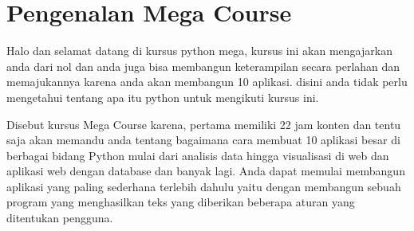 \section{Pengenalan Mega Course}

Halo dan selamat datang di kursus python mega, kursus ini akan mengajarkan anda dari nol dan anda juga bisa membangun keterampilan secara perlahan dan memajukannya karena anda akan membangun 10 aplikasi. disini anda tidak perlu mengetahui tentang apa itu python untuk mengikuti kursus ini.

Disebut kursus Mega Course karena, pertama memiliki 22 jam konten dan tentu saja akan memandu anda tentang bagaimana cara membuat 10 aplikasi besar di berbagai bidang Python mulai dari analisis data hingga visualisasi di web dan aplikasi web dengan database dan banyak lagi. Anda dapat memulai membangun aplikasi yang paling sederhana terlebih dahulu yaitu dengan membangun sebuah program yang menghasilkan teks yang diberikan beberapa aturan yang ditentukan pengguna.
